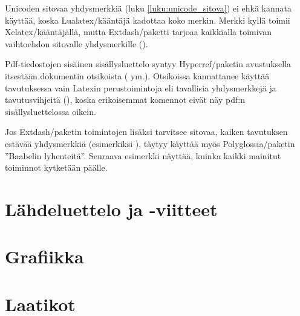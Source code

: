 Unicoden sitovaa yhdysmerkkiä (luku \ref{luku:unicode_sitova}) ei ehkä
kannata käyttää, koska Lualatex\-/kääntäjä kadottaa koko merkin. Merkki
kyllä toimii Xelatex\-/kääntäjällä, mutta Extdash\-/paketti tarjoaa
kaikkialla toimivan vaihto\-ehdon sitovalle yhdysmerkille (\koodi{\keno
  =/}).

Pdf-tiedostojen sisäinen sisällysluettelo syntyy Hyperref\-/paketin
avustuksella itsestään dokumentin otsikoista (
ym.). Otsikoissa kannattanee käyttää tavutuksessa vain Latexin
perustoimintoja eli tavallisia yhdysmerkkejä ja tavutusvihjeitä
(\koodi{\keno-}), koska erikoisemmat komennot eivät näy pdf:n
sisällysluettelossa oikein.

Jos Extdash\-/paketin toimintojen lisäksi tarvitsee sitovaa, kaiken
tavutuksen estävää yhdysmerkkiä (esimerkiksi
), täytyy käyttää myös
Polyglossia\-/paketin ''Baabelin lyhenteitä''. Seuraava esimerkki
näyttää, kuinka kaikki mainitut toiminnot kytketään päälle.

\begin{koodilohkosis}
  \usepackage{polyglossia}
  \usepackage[shortcuts]{extdash}
  \setdefaultlanguage[babelshorthands]{finnish}
\end{koodilohkosis}

\section{Lähdeluettelo ja -viitteet}
\section{Grafiikka}
\section{Laatikot}
